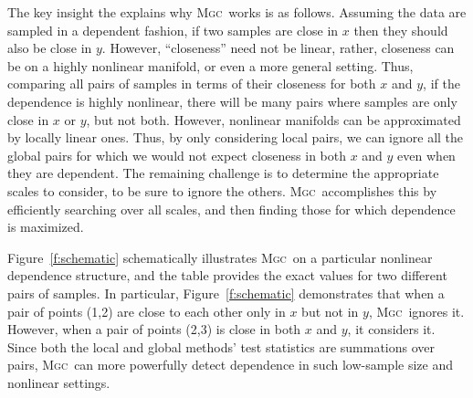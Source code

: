 \documentclass[11pt]{article}
\providecommand{\sct}[1]{{\normalfont\textsc{#1}}}
\newcommand{\Mgc}{\sct{Mgc}}
\begin{document}
The key insight the explains why \Mgc~works is as follows.  
Assuming the data are sampled in a dependent fashion,  if two samples are close in $x$ then they should also be close in $y$.  However, ``closeness'' need not be linear, rather, closeness can be on a highly nonlinear manifold, or even a more general setting.  Thus,  comparing all pairs of samples in terms of their closeness for both $x$ and $y$, if the dependence is highly nonlinear, there will be many pairs where samples are only close in $x$ or $y$, but not both.  
However, nonlinear manifolds can be approximated by locally linear ones.  
Thus, by only considering local pairs, we can ignore all the global pairs for which we would not expect closeness in both $x$ and $y$ even when they are dependent.  
The remaining challenge is to determine the appropriate scales to consider, to be sure to ignore the others.  \Mgc~accomplishes this by efficiently searching over all scales, and then finding those for which dependence is maximized.  



Figure~\ref{f:schematic} schematically illustrates \Mgc~on a particular nonlinear dependence structure, and the table provides the exact values for two different pairs of samples.  In particular, Figure~\ref{f:schematic} demonstrates that when a pair of points (1,2) are close to each other only in $x$ but not in $y$, \Mgc~ignores it.  However, when a pair of points (2,3) is close in both $x$ and $y$, it considers it.  Since both the local and global methods' test statistics are summations over pairs,  \Mgc~can more powerfully detect dependence in such low-sample size and nonlinear settings.
\end{document}
